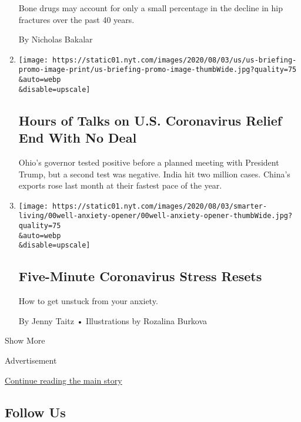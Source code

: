 \begin{enumerate}
  Bone drugs may account for only a small percentage in the decline in
  hip fractures over the past 40 years.

  By Nicholas Bakalar
\item
  \href{/2020/08/06/world/coronavirus-covid.html}{}

  \texttt{[image: https://static01.nyt.com/images/2020/08/03/us/us-briefing-promo-image-print/us-briefing-promo-image-thumbWide.jpg?quality=75\\\&auto=webp\\\&disable=upscale]}

  \hypertarget{hours-of-talks-on-us-coronavirus-relief-end-with-no-deal}{%
  \subsection{Hours of Talks on U.S. Coronavirus Relief End With No
  Deal}\label{hours-of-talks-on-us-coronavirus-relief-end-with-no-deal}}

  Ohio's governor tested positive before a planned meeting with
  President Trump, but a second test was negative. India hit two million
  cases. China's exports rose last month at their fastest pace of the
  year.
\item
  \href{/2020/08/06/well/mind/five-minute-coronavirus-stress-resets.html}{}

  \texttt{[image: https://static01.nyt.com/images/2020/08/03/smarter-living/00well-anxiety-opener/00well-anxiety-opener-thumbWide.jpg?quality=75\\\&auto=webp\\\&disable=upscale]}

  \hypertarget{five-minute-coronavirus-stress-resets-1}{%
  \subsection{Five-Minute Coronavirus Stress
  Resets}\label{five-minute-coronavirus-stress-resets-1}}

  How to get unstuck from your anxiety.

  By Jenny Taitz • Illustrations by Rozalina Burkova
\end{enumerate}

Show More

Advertisement

\protect\hyperlink{after-mid3}{Continue reading the main story}

\hypertarget{follow-us}{%
\subsection{Follow Us}\label{follow-us}}

